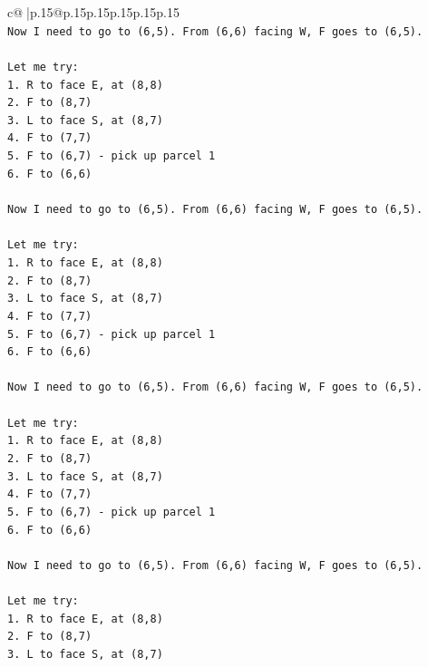 \documentclass{article}
\begin{document}
{\begin{supertabular}{c@{$\;$}|p{.15\linewidth}@{}p{.15\linewidth}p{.15\linewidth}p{.15\linewidth}p{.15\linewidth}p{.15\linewidth}}
{{{\\ 
\texttt{Now I need to go to (6,5). From (6,6) facing W, F goes to (6,5).} \\
\\ 
\texttt{Let me try:} \\
\texttt{1. R to face E, at (8,8)} \\
\texttt{2. F to (8,7)} \\
\texttt{3. L to face S, at (8,7)} \\
\texttt{4. F to (7,7)} \\
\texttt{5. F to (6,7) {-} pick up parcel 1} \\
\texttt{6. F to (6,6)} \\
\\ 
\texttt{Now I need to go to (6,5). From (6,6) facing W, F goes to (6,5).} \\
\\ 
\texttt{Let me try:} \\
\texttt{1. R to face E, at (8,8)} \\
\texttt{2. F to (8,7)} \\
\texttt{3. L to face S, at (8,7)} \\
\texttt{4. F to (7,7)} \\
\texttt{5. F to (6,7) {-} pick up parcel 1} \\
\texttt{6. F to (6,6)} \\
\\ 
\texttt{Now I need to go to (6,5). From (6,6) facing W, F goes to (6,5).} \\
\\ 
\texttt{Let me try:} \\
\texttt{1. R to face E, at (8,8)} \\
\texttt{2. F to (8,7)} \\
\texttt{3. L to face S, at (8,7)} \\
\texttt{4. F to (7,7)} \\
\texttt{5. F to (6,7) {-} pick up parcel 1} \\
\texttt{6. F to (6,6)} \\
\\ 
\texttt{Now I need to go to (6,5). From (6,6) facing W, F goes to (6,5).} \\
\\ 
\texttt{Let me try:} \\
\texttt{1. R to face E, at (8,8)} \\
\texttt{2. F to (8,7)} \\
\texttt{3. L to face S, at (8,7)} \\
}}}
\end{supertabular}}
\end{document}
